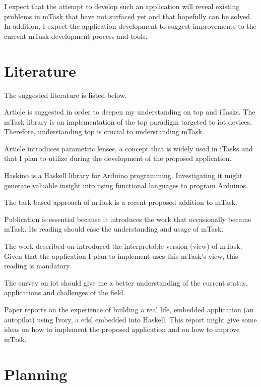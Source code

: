 \documentclass{article}
\begin{document}
I expect that the attempt to develop such an application will reveal existing problems in mTask that have not surfaced yet and that hopefully can be solved. In addition, I expect the application development to suggest improvements to the current mTask development process and tools.

\section{Literature}
The suggested literature is listed below.

\nocite{*}
\printbibliography[heading={none}]

Article \cite{top} is suggested in order to deepen my understanding on \acrshort{top} and iTasks. The mTask library is an implementation of the \acrshort{top} paradigm targeted to \acrshort{iot} devices. Therefore, understanding \acrshort{top} is crucial to understanding mTask.

Article \cite{parametric} introduces parametric lenses, a concept that is widely used in iTasks and that I plan to utilize during the development of the proposed application. 

Haskino \cite{haskino} is a Haskell library for Arduino programming. Investigating it might generate valuable insight into using functional languages to program Arduinos.

The task-based approach of mTask \cite{micro} is a recent proposed addition to mTask.

Publication \cite{mtasks} is essential because it introduces the work that occasionally became mTask. Its reading should ease the understanding and usage of mTask.

The work described on \cite{martthesis} introduced the interpretable version (view) of mTask. Given that the application I plan to implement uses this mTask's view, this reading is mandatory.

The survey on \acrshort{iot} \cite{survey} should give me a better understanding of the current status, applications and challenges of the field.

Paper \cite{ivory} reports on the experience of building a real life, embedded application (an autopilot) using Ivory, a \acrshort{edsl} embedded into Haskell. This report might give some ideas on how to implement the proposed application and on how to improve mTask.

\section{Planning}
\end{document}
